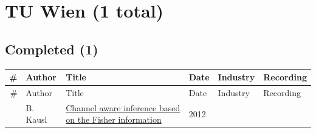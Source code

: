 \documentclass[11pt,a4paper]{article}
\begin{document}
\section*{TU Wien (1 total)}

\subsection*{Completed (1)}

\begin{longtable}{@{}r p{2.8cm} p{6.3cm} p{1.6cm} p{2cm} p{1.8cm}@{}}
\toprule
\# & Author & Title & Date & Industry & Recording \\
\midrule
\endfirsthead
\toprule
\# & Author & Title & Date & Industry & Recording \\
\midrule
\endhead
\bottomrule
\endfoot
1 & B. Kausl & \href{http://hdl.handle.net/20.500.12708/8885}{Channel aware inference based on the Fisher information} & 2012 &  &  \\
\end{longtable}
\end{document}
